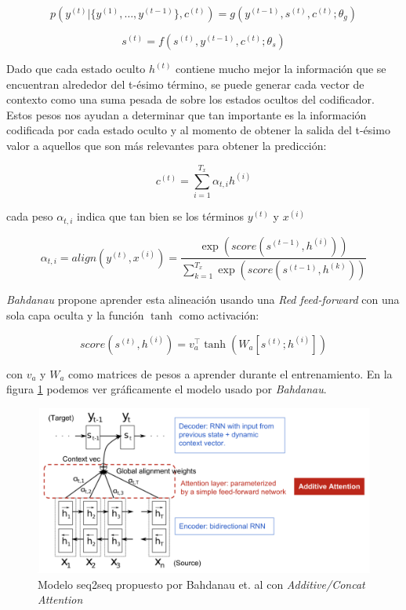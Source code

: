 \begin{equation}
    p(y^{(t)} | \{y^{(1)}, \dots , y^{(t-1)}\}, c^{(t)}) = g(y^{(t-1)}, s^{(t)}, c^{(t)}; \theta_g)
\end{equation}

\begin{equation}
    s^{(t)} = f(s^{(t)}, y^{(t-1)}, c^{(t)}; \theta_s)
\end{equation}

Dado que cada estado oculto $h^{(t)}$ contiene mucho mejor la información que se encuentran alrededor
del t-ésimo término, se puede generar cada vector de contexto como una suma pesada de sobre los
estados ocultos del codificador. Estos pesos nos ayudan a determinar que tan importante es la
información codificada por cada estado oculto y al momento de obtener la salida del t-ésimo valor
 a aquellos que son más relevantes para obtener la predicción:

\begin{equation}
    c^{(t)} = \sum_{i=1}^{T_x} \alpha_{t,i} h^{(i)}
\end{equation}

cada peso $\alpha_{t,i}$ indica que tan bien se  los términos $y^{(t)}$ y $x^{(i)}$

\begin{equation}
    \alpha_{t,i} = align(y^{(t)}, x^{(i)}) = \frac{\exp(score(s^{(t-1)}, h^{(i)}))}{\sum_{k=1}^{T_x} \exp(score(s^{(t-1)}, h^{(k)}))}
\end{equation}

\textit{Bahdanau} propone aprender esta alineación usando una \textit{Red feed-forward} con una sola
capa oculta y la función $\tanh$ como activación:

\begin{equation}
    score(s^{(t)}, h^{(i)}) = v^\top_a \tanh(W_a[s^{(t)};h^{(i)}])
\end{equation}

con $v_a$ y $W_a$ como matrices de pesos a aprender durante el entrenamiento. En la figura \ref{fig:att}
podemos ver gráficamente el modelo usado por \textit{Bahdanau}.

\begin{figure}[ht!]
    \centering
    \includegraphics[width=0.8 \textwidth]{Chapters/1. Transformer/Figures/rnn/attention.png}
    \caption{Modelo seq2seq propuesto por Bahdanau et. al \cite{bahdanau2016neural} con \textit{Additive/Concat Attention}}
    \label{fig:att}
\end{figure}


